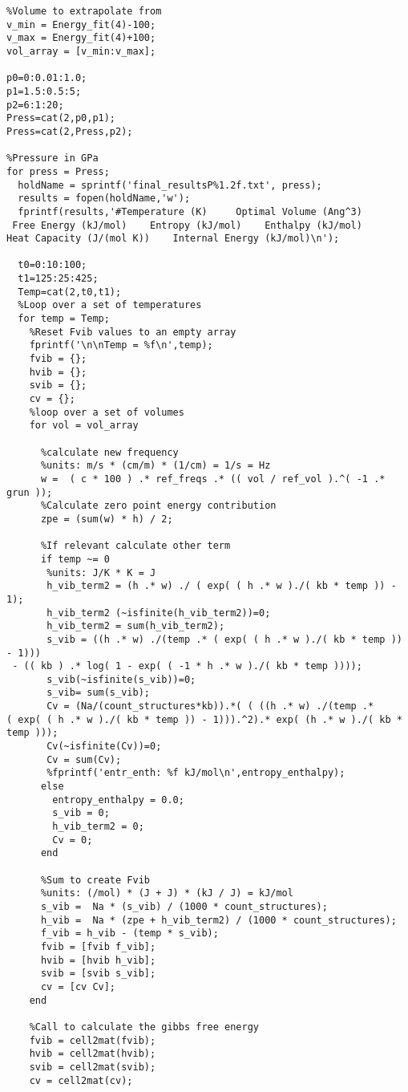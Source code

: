 \documentclass[11pt,letterpaper]{article}
\begin{document}
\begin{spacing}{1.0}
\begin{verbatim}
%Volume to extrapolate from
v_min = Energy_fit(4)-100;
v_max = Energy_fit(4)+100;
vol_array = [v_min:v_max];

p0=0:0.01:1.0;
p1=1.5:0.5:5;
p2=6:1:20;
Press=cat(2,p0,p1);
Press=cat(2,Press,p2);

%Pressure in GPa
for press = Press;
  holdName = sprintf('final_resultsP%1.2f.txt', press);
  results = fopen(holdName,'w');
  fprintf(results,'#Temperature (K)     Optimal Volume (Ang^3)   
 Free Energy (kJ/mol)    Entropy (kJ/mol)    Enthalpy (kJ/mol)    
Heat Capacity (J/(mol K))    Internal Energy (kJ/mol)\n');
  
  t0=0:10:100;
  t1=125:25:425;
  Temp=cat(2,t0,t1);
  %Loop over a set of temperatures
  for temp = Temp;
    %Reset Fvib values to an empty array
    fprintf('\n\nTemp = %f\n',temp);
    fvib = {};
    hvib = {};
    svib = {};
    cv = {};
    %loop over a set of volumes
    for vol = vol_array

      %calculate new frequency
      %units: m/s * (cm/m) * (1/cm) = 1/s = Hz
      w =  ( c * 100 ) .* ref_freqs .* (( vol / ref_vol ).^( -1 .* grun ));
      %Calculate zero point energy contribution
      zpe = (sum(w) * h) / 2;
    
      %If relevant calculate other term
      if temp ~= 0
       %units: J/K * K = J
       h_vib_term2 = (h .* w) ./ ( exp( ( h .* w )./( kb * temp )) - 1);
       h_vib_term2 (~isfinite(h_vib_term2))=0;
       h_vib_term2 = sum(h_vib_term2);
       s_vib = ((h .* w) ./(temp .* ( exp( ( h .* w )./( kb * temp )) - 1)))
 - (( kb ) .* log( 1 - exp( ( -1 * h .* w )./( kb * temp ))));
       s_vib(~isfinite(s_vib))=0;
       s_vib= sum(s_vib);   
       Cv = (Na/(count_structures*kb)).*( ( ((h .* w) ./(temp .* 
( exp( ( h .* w )./( kb * temp )) - 1))).^2).* exp( (h .* w )./( kb * temp )));
       Cv(~isfinite(Cv))=0;
       Cv = sum(Cv);     
       %fprintf('entr_enth: %f kJ/mol\n',entropy_enthalpy);       
      else
        entropy_enthalpy = 0.0;
        s_vib = 0;
        h_vib_term2 = 0;
        Cv = 0;
      end
    
      %Sum to create Fvib
      %units: (/mol) * (J + J) * (kJ / J) = kJ/mol
      s_vib =  Na * (s_vib) / (1000 * count_structures);
      h_vib =  Na * (zpe + h_vib_term2) / (1000 * count_structures);
      f_vib = h_vib - (temp * s_vib);
      fvib = [fvib f_vib];
      hvib = [hvib h_vib];   
      svib = [svib s_vib];
      cv = [cv Cv];
    end
    
    %Call to calculate the gibbs free energy
    fvib = cell2mat(fvib);
    hvib = cell2mat(hvib);
    svib = cell2mat(svib);
    cv = cell2mat(cv);
  

\end{verbatim}
\end{spacing}
\end{document}
